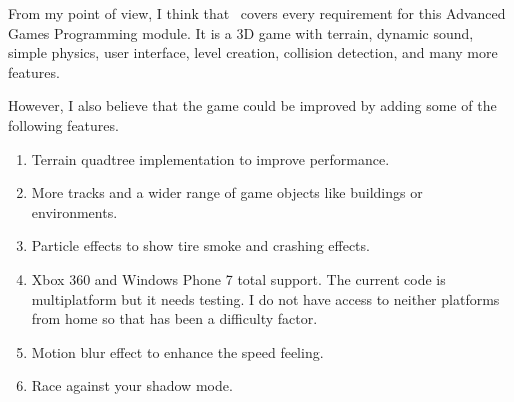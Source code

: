 
From my point of view, I think that \game\ covers every requirement for this
Advanced Games Programming module. It is a 3D game with terrain, dynamic sound,
simple physics, user interface, level creation, collision detection, and many
more features.\\


However, I also believe that the game could be improved by adding some of the
following features.

\begin{enumerate}
	\item Terrain quadtree implementation to improve performance.
	\item More tracks and a wider range of game objects like buildings or environments.
	\item Particle effects to show tire smoke and crashing effects.
	\item Xbox 360 and Windows Phone 7 total support. The current code is multiplatform
	but it needs testing. I do not have access to neither platforms from home so that has
	been a difficulty factor.
	\item Motion blur effect to enhance the speed feeling.
	\item Race against your shadow mode.
\end{enumerate}